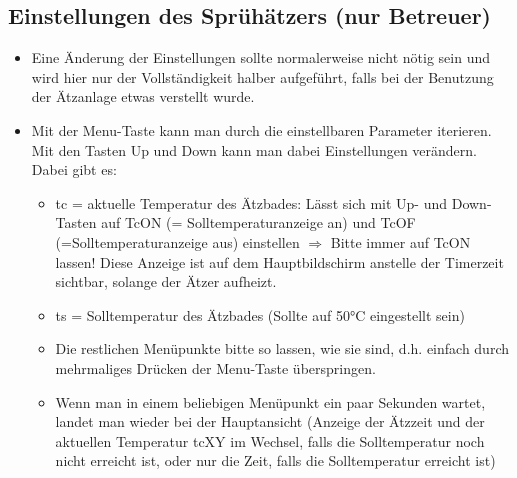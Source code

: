 \documentclass{\basedir/fablab-document}
\begin{document}
\subsection{Einstellungen des Sprühätzers (nur Betreuer)}
\begin{itemize}
\item Eine Änderung der Einstellungen sollte normalerweise nicht nötig sein und wird hier nur der Vollständigkeit halber aufgeführt, falls bei der Benutzung der Ätzanlage etwas verstellt wurde.
\item Mit der Menu-Taste kann man durch die einstellbaren Parameter iterieren. Mit den Tasten Up und Down kann man dabei Einstellungen verändern. Dabei gibt es:
\begin{itemize}
\item tc = aktuelle Temperatur des Ätzbades: Lässt sich mit Up- und Down-Tasten auf TcON (= Solltemperaturanzeige an) und TcOF (=Solltemperaturanzeige aus) einstellen $\Rightarrow$ Bitte immer auf TcON lassen! Diese Anzeige ist auf dem Hauptbildschirm anstelle der Timerzeit sichtbar, solange der Ätzer aufheizt.
\item ts = Solltemperatur des Ätzbades (Sollte auf 50°C eingestellt sein)
\item Die restlichen Menüpunkte bitte so lassen, wie sie sind, d.h. einfach durch mehrmaliges Drücken der Menu-Taste überspringen.
\item Wenn man in einem beliebigen Menüpunkt ein paar Sekunden wartet, landet man wieder bei der Hauptansicht (Anzeige der Ätzzeit und der aktuellen Temperatur tcXY im Wechsel, falls die Solltemperatur noch nicht erreicht ist, oder nur die Zeit, falls die Solltemperatur erreicht ist) 
\end{itemize}
\end{itemize}

\newpage
{}
\end{document}
